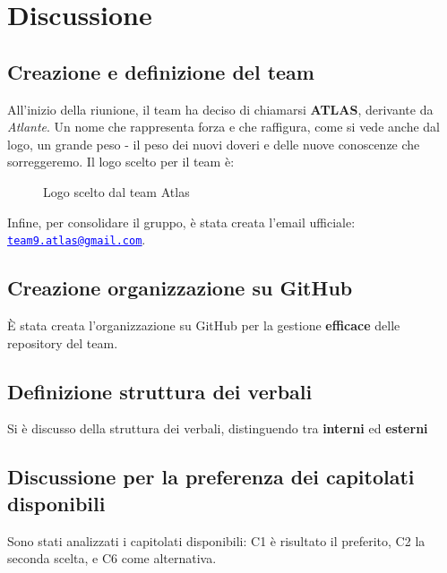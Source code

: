 \documentclass[a4paper,12pt]{article}
\makeatletter
\newcommand{\Email}{\href{mailto:team9.atlas@gmail.com}{\textcolor{blue}{\underline{team9.atlas@gmail.com}}}}
\newcommand{\LogoGruppo}{img/AtlasLogo.png} %
\makeatother
\begin{document}
\section{Discussione}{
    \subsection{Creazione e definizione del team}{
        All'inizio della riunione, il team ha deciso di chiamarsi \textbf{ATLAS}, derivante da \emph{Atlante}.  
        Un nome che rappresenta forza e che raffigura, come si vede anche dal logo, un grande peso - il peso dei nuovi doveri e delle nuove conoscenze che sorreggeremo. Il logo scelto per il team è:

        \begin{figure}[h]
            \centering
            \caption{Logo scelto dal team Atlas}
            \label{fig:logo-atlas}
        \end{figure}

        Infine, per consolidare il gruppo, è stata creata l'email ufficiale: \texttt{\Email}.
        }

        \subsection{Creazione organizzazione su GitHub}{
        È stata creata l'organizzazione su GitHub per la gestione \textbf{efficace} delle repository del team. 
        }

        \subsection{Definizione struttura dei verbali}{
        Si è discusso della struttura dei verbali, distinguendo tra \textbf{interni} ed \textbf{esterni}
        }

        \subsection{Discussione per la preferenza dei capitolati disponibili}{
        Sono stati analizzati i capitolati disponibili: C1 è risultato il preferito, C2 la seconda scelta, e C6 come alternativa.  
        }

}
\end{document}
